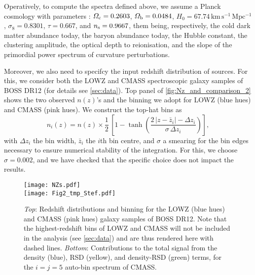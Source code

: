 \documentclass[astrosymb,twocolumn]{aastex631}
\let\Omega\varOmega
\begin{document}
% 
Operatively, to compute the spectra defined above, we assume a Planck cosmology with parameters \citep{Ade2015}: \(\Omega_{\rm c}=0.2603\), \(\Omega_{\rm b}=0.0484\), \(H_0=67.74\,\mathrm{km\,s^{-1}\,Mpc^{-1}}\), \(\sigma_8=0.8301\), \(\tau=0.667\), and \(n_{\rm s}=0.9667\), them being, respectively, the cold dark matter abundance today, the baryon abundance today, the Hubble constant, the clustering amplitude, the optical depth to reionisation, and the slope of the primordial power spectrum of curvature perturbations.

Moreover, we also need to specifcy the input redshift distribution of sources. For this, we consider both the LOWZ and CMASS spectroscopic galaxy samples of BOSS DR12 (for details see \autoref{sec:data}). Top panel of \autoref{fig:Nz_and_comparison_2} shows the two observed \(n(z)\)'s and the binning we adopt for LOWZ (blue hues) and CMASS (pink hues). We construct the top-hat bins as
\begin{equation}
n_i(z)= n(z) \times \frac12\,\left[1-\tanh\left({\frac{2\,|z-\bar{z}_i|-\varDelta z_i}{\sigma\,\varDelta z_i }}\right)\right],
    \label{eq:tophats}
\end{equation}
with \({\varDelta}z_i\) the bin width, \(\bar{z}_i\) the \(i\)th bin centre, and \(\sigma\) a smearing for the bin edges necessary to ensure numerical stability of the integration. For this, we choose \(\sigma=0.002\), and we have checked that the specific choice does not impact the results.
\begin{figure}
    \centering
    \texttt{[image: NZs.pdf]}\\
    \texttt{[image: Fig2\_tmp\_Stef.pdf]}
    \caption{\textit{Top}: Redshift distributions and binning for the LOWZ (blue hues) and CMASS (pink hues) galaxy samples of BOSS DR12. Note that the highest-redshift bins of LOWZ and CMASS will not be included in the analysis (see \autoref{sec:data}) and are thus rendered here with dashed lines. \textit{Bottom}: Contributions to the total signal from the density (blue), RSD (yellow), and density-RSD (green) terms, for the \(i=j=5\) auto-bin spectrum of CMASS.}
    \label{fig:Nz_and_comparison_2}
\end{figure}
\end{document}

